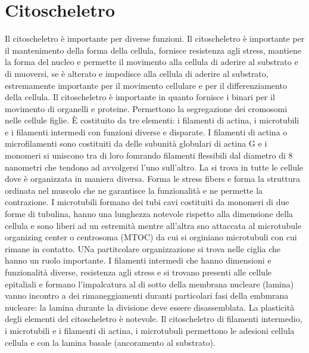 \chapter{Citoscheletro}
Il citoscheletro \`e importante per diverse funzioni. Il citoscheletro \`e importante per il mantenimento della forma della cellula, fornisce resistenza agli stress, mantiene la forma
del nucleo e permette il movimento alla cellula di aderire al substrato e di muoversi, se \`e alterato e impedisce alla cellula di aderire al substrato, estremamente importante per il
movimento cellulare e per il differenziamento della cellula. Il citoscheletro \`e importante in quanto fornisce i binari per il movimento di organelli e proteine. Permettono la 
segregazione dei cromosomi nelle cellule figlie. \`E costituito da tre elementi: i filamenti di actina, i microtubili e i filamenti intermedi con funzioni diverse e disparate. I 
filamenti di actina o microfilamenti sono costituiti da delle subunit\`a globulari di actina G e i monomeri si uniscono tra di loro fomrando filamenti flessibili dal diametro di 8 
nanometri che tendono ad avvolgersi l'uno sull'altro. La si trova in tutte le cellule dove \`e organizzata in maniera diversa. Forma le stress fibers e forma la struttura ordinata nel 
muscolo che ne garantisce la funzionalit\`a e ne permette la contrazione. I microtubili formano dei tubi cavi costituiti da monomeri di due forme di tubulina, hanno una lunghezza 
notevole rispetto alla dimensione della cellula e sono liberi ad un estremit\`a mentre all'altra sno attaccata al microtubule organizing center o centrosoma (MTOC) da cui si orginiano
microtubuli con cui rimane in contatto. UNa partitcolare organizzazione si trova nelle ciglia che hanno un ruolo importante. I filamenti intermedi che hanno dimensioni e funzionalit\`a
diverse, resistenza agli stress e si trovano presenti alle cellule epitaliali e formano l'impalcatura al di sotto della membrana nucleare (lamina) vanno incontro a dei rimaneggiamenti
duranti particolari fasi della embmrana nucleare: la lamina durante la divisione deve essere disassemblata. La plasticit\`a degli elementi del citoscheletro \`e notevole. Il citoscheletro
di filamenti intermedio, i microtubili e i filamenti di actina, i microtubuli permettono le adesioni cellula cellula e con la lamina basale (ancoramento al substrato). 
